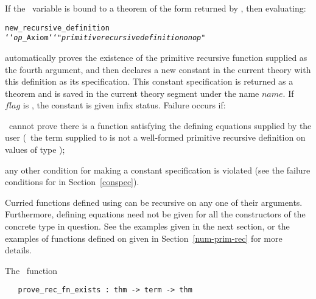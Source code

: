 {{If the \ML\ variable  is bound to a theorem of the form
returned by ,
then evaluating:

{\def\op{{\normalsize\sl op}}
\begin{hol}\begin{alltt}
   new_recursive_definition 
     `` \op\_Axiom `` "{\normalsize\it primitive recursive definition on \op}"
\end{alltt}\end{hol}}

\noindent  automatically proves the existence of the primitive recursive
function supplied as the fourth argument, 
and then declares a new constant in the current theory
with this definition as its
specification. This constant specification is returned as a theorem
and is saved in the current theory segment under the name
$name$.
If $flag$ is , the constant is given infix status.
Failure occurs if:

\begin{myenumerate}
\item \HOL\ cannot prove there is a function 
satisfying the defining equations supplied by the user 
(\ie\ the term supplied to  
 is not a well-formed primitive recursive definition on values 
of type );
\item any other condition for making a constant specification is violated
(see the failure conditions for  in 
Section~\ref{conspec}).
\end{myenumerate}

Curried
functions defined using  can be
recursive on any one of their arguments.  Furthermore, defining equations need
not be given for all the constructors of the concrete type in question.  See
the examples given in the next section, or the examples of functions 
defined on  given in Section~\ref{num-prim-rec} for more details.

The \ML\ function 

\begin{boxed}
\begin{verbatim}
   prove_rec_fn_exists : thm -> term -> thm
\end{verbatim}\end{boxed}

}}
